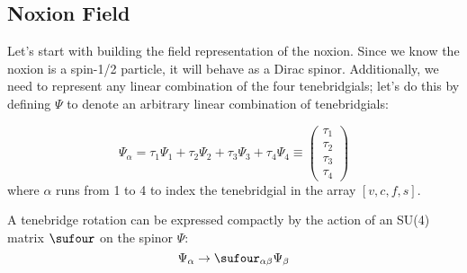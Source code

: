 \subsection{Noxion Field}
Let's start with building the field representation of the noxion. Since we know the noxion is a spin-1/2 particle, it will behave as a Dirac spinor. Additionally, we need to represent any linear combination of the four tenebridgials; let's do this by defining \(\Psi\) to denote an arbitrary linear combination of tenebridgials:
\begin{definition}
  \[\Psi_{\alpha} = \tau_1 \Psi_1 + \tau_2 \Psi_2 + \tau_3 \Psi_3 + \tau_4 \Psi_4 \equiv
    \begin{pmatrix}\tau_1 \\ \tau_2 \\ \tau_3 \\ \tau_4 \end{pmatrix}\]
  where \(\alpha\) runs from 1 to 4 to index the tenebridgial in the array \(\left[v, c, f, s \right]\).
\end{definition}

A tenebridge rotation can be expressed compactly by the action of an SU(4) matrix \(\sufour\) on the spinor \(\Psi\):
\[
  \Psi_{\alpha} \rightarrow \sufour_{\alpha\beta} \Psi_{\beta}
\]

